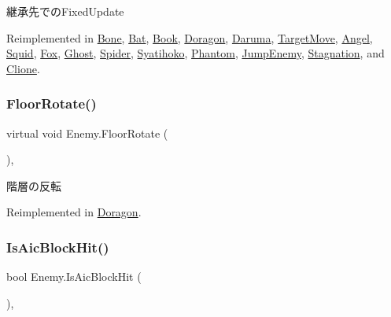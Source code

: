 継承先での\+Fixed\+Update 



Reimplemented in \hyperlink{class_bone_ae81be60a677bf474ff4634cea32921dc}{Bone}, \hyperlink{class_bat_af1e6e4432c5f803973be596a31cbb650}{Bat}, \hyperlink{class_book_ad838b454ccd9f8c4e88215aa220226a4}{Book}, \hyperlink{class_doragon_abf6c6c47805aa970c8dac34b61f38719}{Doragon}, \hyperlink{class_daruma_aacb22dfd1f65e403acf44231e308e97c}{Daruma}, \hyperlink{class_target_move_a4e86c888ec0ad3b43c30a6ff17a0411d}{Target\+Move}, \hyperlink{class_angel_a2c35f5d2b12e43d64cc686728a6225c2}{Angel}, \hyperlink{class_squid_ab737cee06933e0631c45bb7fef86fe6b}{Squid}, \hyperlink{class_fox_a34985f75859d53cd02305e84dfa8a058}{Fox}, \hyperlink{class_ghost_a26c210f4d5bfbecc82cd577fafb0cfdb}{Ghost}, \hyperlink{class_spider_a343565aa379615a2602907dd25137ed9}{Spider}, \hyperlink{class_syatihoko_a921cf2c05d610f19214fb476c9ff8a6c}{Syatihoko}, \hyperlink{class_phantom_ab639a11fe75cb4bce641d5bd52601fae}{Phantom}, \hyperlink{class_jump_enemy_ab5eb8680db77e9ed5ab5696b41aa7b29}{Jump\+Enemy}, \hyperlink{class_stagnation_ae0fe7818f0319e53bf2f25d8659af12f}{Stagnation}, and \hyperlink{class_clione_a59ce5c64ae6b106a6ef39dd5773ebafc}{Clione}.

\mbox{\label{class_enemy_add93027b5ee19288ed26aa6f98fb88f8}} 
\subsubsection{\texorpdfstring{Floor\+Rotate()}{FloorRotate()}}
{\footnotesize\ttfamily virtual void Enemy.\+Floor\+Rotate (\begin{DoxyParamCaption}{ }\end{DoxyParamCaption})\hspace{0.3cm}{\ttfamily [inline]}, {\ttfamily [virtual]}}



階層の反転 



Reimplemented in \hyperlink{class_doragon_ad83502ad8778d1e9fa0f6d2d72526d85}{Doragon}.

\mbox{\label{class_enemy_a16617ee5a2f6bf7d5ae879dd9ca2d230}} 
\subsubsection{\texorpdfstring{Is\+Aic\+Block\+Hit()}{IsAicBlockHit()}}
{\footnotesize\ttfamily bool Enemy.\+Is\+Aic\+Block\+Hit (\begin{DoxyParamCaption}{ }\end{DoxyParamCaption})\hspace{0.3cm}{\ttfamily [inline]}, {\ttfamily [protected]}}



